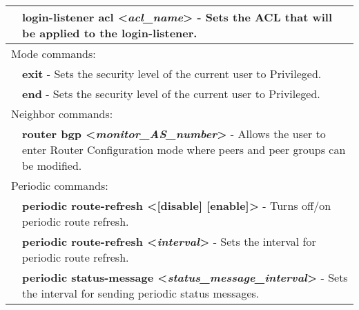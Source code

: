 \begin{tabular}{|p{10pt}p{400pt}|}
& {\bf \small login-listener acl \textless\emph{acl\_name}\textgreater} - Sets the ACL that will be applied to the login-listener.\\[4pt]


\hline

\multicolumn{2}{|l|}{Mode commands:}\\ 

\hline

& {\bf \small exit } - Sets the security level of the current user to Privileged.\\[4pt]

& {\bf \small end } - Sets the security level of the current user to Privileged.\\[4pt]

\hline

\multicolumn{2}{|l|}{Neighbor commands:}\\ 

\hline

& {\bf \small router bgp \textless\emph{monitor\_AS\_number}\textgreater} - Allows the user to enter Router Configuration mode where peers and peer groups can be modified.\\[4pt]

\hline

\multicolumn{2}{|l|}{Periodic commands:}\\ 

\hline

& {\bf \small periodic route-refresh \textless[disable] [enable]\textgreater} - Turns off/on periodic route refresh. \\[4pt]

& {\bf \small periodic route-refresh \textless\emph{interval}\textgreater} - Sets the interval for periodic route refresh.\\[4pt]

& {\bf \small periodic status-message \textless\emph{status\_message\_interval}\textgreater} - Sets the interval for sending periodic status messages.\\[4pt]

\hline

\end{tabular}

